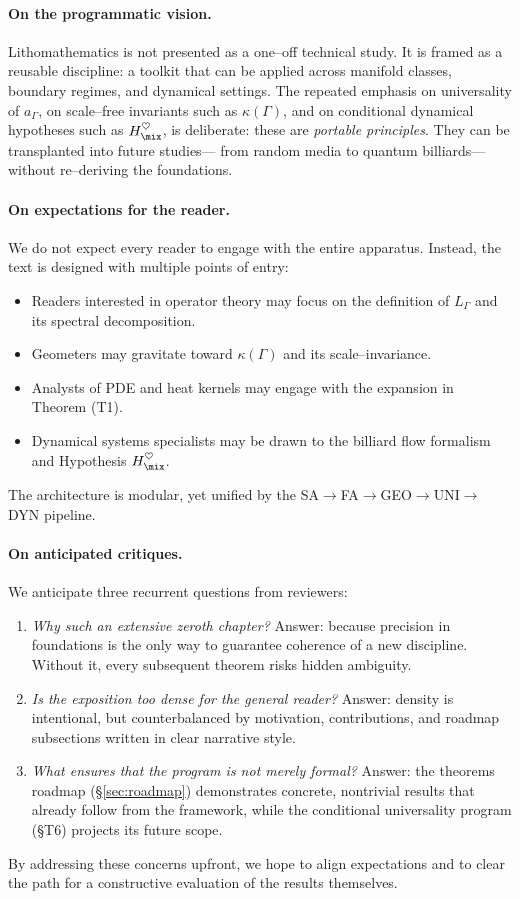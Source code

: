 \paragraph{On the programmatic vision.}
Lithomathematics is not presented as a one–off technical study. 
It is framed as a reusable discipline: 
a toolkit that can be applied across manifold classes, 
boundary regimes, and dynamical settings. 
The repeated emphasis on universality of $a_\Gamma$, 
on scale–free invariants such as $\kappa(\Gamma)$, 
and on conditional dynamical hypotheses such as $H_{\mix}^\heartsuit$, 
is deliberate: these are \emph{portable principles}. 
They can be transplanted into future studies— 
from random media to quantum billiards— 
without re–deriving the foundations. 

\paragraph{On expectations for the reader.}
We do not expect every reader to engage with the entire apparatus. 
Instead, the text is designed with multiple points of entry: 
\begin{itemize}
  \item Readers interested in operator theory may focus on 
  the definition of $L_\Gamma$ and its spectral decomposition. 
  \item Geometers may gravitate toward $\kappa(\Gamma)$ 
  and its scale–invariance. 
  \item Analysts of PDE and heat kernels may engage 
  with the expansion in Theorem (T1). 
  \item Dynamical systems specialists may be drawn to the billiard flow 
  formalism and Hypothesis $H_{\mix}^\heartsuit$. 
\end{itemize}
The architecture is modular, yet unified by the 
SA$\to$FA$\to$GEO$\to$UNI$\to$DYN pipeline. 

\paragraph{On anticipated critiques.}
We anticipate three recurrent questions from reviewers:
\begin{enumerate}
  \item \emph{Why such an extensive zeroth chapter?}  
  Answer: because precision in foundations is the only way 
  to guarantee coherence of a new discipline. 
  Without it, every subsequent theorem risks hidden ambiguity. 
  \item \emph{Is the exposition too dense for the general reader?}  
  Answer: density is intentional, but counterbalanced by motivation, 
  contributions, and roadmap subsections written in clear narrative style. 
  \item \emph{What ensures that the program is not merely formal?}  
  Answer: the theorems roadmap (§\ref{sec:roadmap}) demonstrates 
  concrete, nontrivial results that already follow from the framework, 
  while the conditional universality program (§T6) projects its future scope. 
\end{enumerate}
By addressing these concerns upfront, 
we hope to align expectations and to clear the path 
for a constructive evaluation of the results themselves. 

